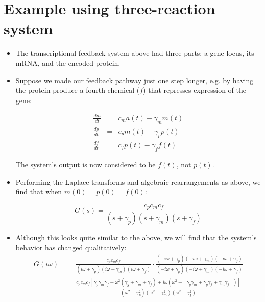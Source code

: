 \documentclass{article}
\begin{document}
\section*{Example using three-reaction system}

\begin{itemize}

\item  The transcriptional feedback system above had three parts: a gene locus, its mRNA, and the encoded protein.

\item Suppose we made our feedback pathway just one step longer, e.g. by having the protein produce a fourth chemical ($f$) that represses expression of the gene:

\begin{eqnarray*}
\frac{dm}{dt} & = & c_m a(t) - \gamma_m m(t)\\
\frac{dp}{dt} & = & c_p m(t) - \gamma_p p(t)\\
\frac{df}{dt} & = & c_f p(t) - \gamma_f f(t)
\end{eqnarray*}

The system's output is now considered to be $f(t)$, not $p(t)$.

\item Performing the Laplace transforms and algebraic rearrangements as above, we find that when $m(0)=p(0)=f(0)$:

\[ G(s) = \frac{c_p c_m c_f}{\left( s + \gamma_p \right)\left( s + \gamma_m \right)\left( s + \gamma_f \right)} \]

\item Although this looks quite similar to the above, we will find that the system's behavior has changed qualitatively:
\begin{eqnarray*}
G(i \omega) & = &  \frac{c_p c_m c_f}{\left( i\omega + \gamma_p \right)\left( i\omega + \gamma_m \right)\left( i\omega + \gamma_f \right)} \cdot \frac{\left(- i\omega + \gamma_p \right)\left( - i\omega + \gamma_m \right)\left( -i\omega + \gamma_f \right)}{\left(- i\omega + \gamma_p \right)\left(- i\omega + \gamma_m \right)\left( -i\omega + \gamma_f \right)}\\
& = & \frac{c_p c_m c_f \left[ \gamma_p \gamma_m \gamma_f - \omega^2 \left(\gamma_g + \gamma_m + \gamma_f \right) + i \omega \left( \omega^2 - \left[ \gamma_g \gamma_m + \gamma_g \gamma_f + \gamma_m \gamma_f \right] \right) \right]}{\left( \omega^2 + \gamma_p^2 \right)\left( \omega^2 + \gamma_m^2 \right)\left( \omega^2 + \gamma_f^2 \right)}
\end{eqnarray*}


\end{itemize}
\end{document}
